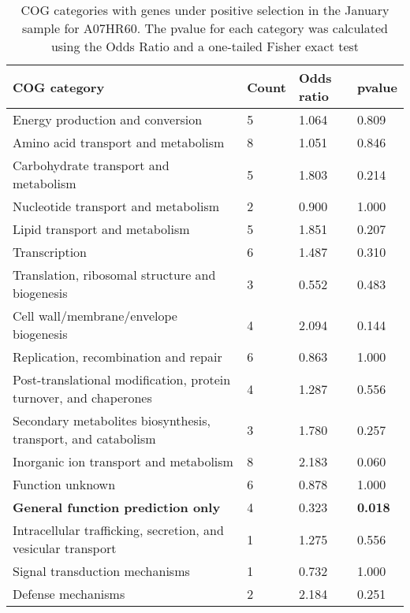 \begin{table}[]
\footnotesize 
	\tabcolsep=0.11cm 
\caption{COG categories with genes under positive selection in the January sample for A07HR60. The pvalue for each category was calculated using the Odds Ratio and a one-tailed Fisher exact test} 
\begin{tabularx}{\textwidth}{L{6cm}R{2cm}R{2cm}R{2cm}} 
\hline 
\textbf{COG category} & \textbf{Count} & \textbf{Odds ratio} & \textbf{pvalue} \\ 
\hline 
Energy production and conversion & 5 & 1.064 & 0.809 \\ 
Amino acid transport and metabolism & 8 & 1.051 & 0.846 \\ 
Carbohydrate transport and metabolism & 5 & 1.803 & 0.214 \\ 
Nucleotide transport and metabolism & 2 & 0.900 & 1.000 \\ 
Lipid transport and metabolism & 5 & 1.851 & 0.207 \\ 
Transcription & 6 & 1.487 & 0.310 \\ 
Translation, ribosomal structure and biogenesis & 3 & 0.552 & 0.483 \\ 
Cell wall/membrane/envelope biogenesis & 4 & 2.094 & 0.144 \\ 
Replication, recombination and repair & 6 & 0.863 & 1.000 \\ 
Post-translational modification, protein turnover, and chaperones & 4 & 1.287 & 0.556 \\ 
Secondary metabolites biosynthesis, transport, and catabolism & 3 & 1.780 & 0.257 \\ 
Inorganic ion transport and metabolism & 8 & 2.183 & 0.060 \\ 
Function unknown & 6 & 0.878 & 1.000 \\ 
\textbf{General function prediction only} & 4 & 0.323 & \textbf{0.018} \\ 
Intracellular trafficking, secretion, and vesicular transport & 1 & 1.275 & 0.556 \\ 
Signal transduction mechanisms & 1 & 0.732 & 1.000 \\ 
Defense mechanisms & 2 & 2.184 & 0.251 \\ 
\end{tabularx} 
\label{January_COG_Selection_A07HR60} 
 \end{table} 

